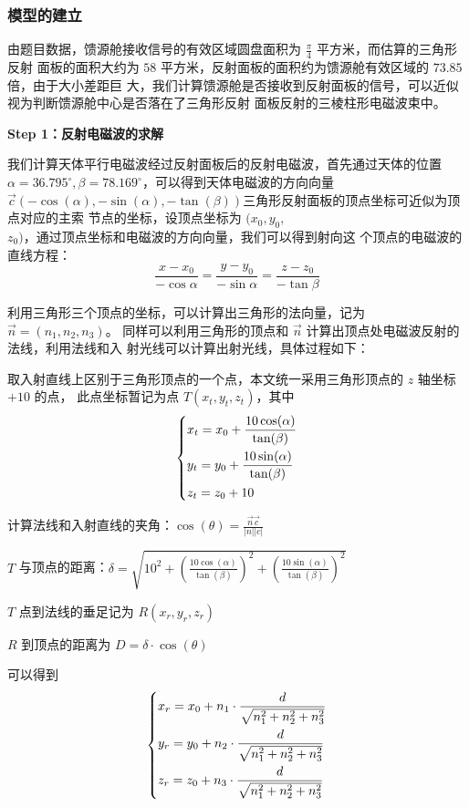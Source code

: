 \documentclass[withoutpreface,bwprint]{cumcmthesis} %
\begin{document}
\subsubsection{模型的建立}
由题目数据，馈源舱接收信号的有效区域圆盘面积为 $\frac{\pi}{4} $ 平方米，而估算的三角形反射
面板的面积大约为 $58$ 平方米，反射面板的面积约为馈源舱有效区域的 $73.85$ 倍，由于大小差距巨
大，我们计算馈源舱是否接收到反射面板的信号，可以近似视为判断馈源舱中心是否落在了三角形反射
面板反射的三棱柱形电磁波束中。

\textbf{Step 1：反射电磁波的求解}

我们计算天体平行电磁波经过反射面板后的反射电磁波，首先通过天体的位置 $\alpha = 36.795^\circ,
\beta = 78.169^\circ$，可以得到天体电磁波的方向向量 $\overrightarrow{c} 
(-\cos(\alpha),-\sin(\alpha),-\tan(\beta))$三角形反射面板的顶点坐标可近似为顶点对应的主索
节点的坐标，设顶点坐标为 $(x_0,y_0,$\\$z_0)$，通过顶点坐标和电磁波的方向向量，我们可以得到射向这
个顶点的电磁波的直线方程：
\[
    \frac{x-x_0}{-\cos\alpha} = \frac{y-y_0}{-\sin\alpha} = \frac{z-z_0}{-\tan\beta} 
\]

利用三角形三个顶点的坐标，可以计算出三角形的法向量，记为 $\overrightarrow{n}=(n_1,n_2,n_3)$。
同样可以利用三角形的顶点和 $\overrightarrow{n} $ 计算出顶点处电磁波反射的法线，利用法线和入
射光线可以计算出射光线，具体过程如下：

取入射直线上区别于三角形顶点的一个点，本文统一采用三角形顶点的 $z$ 轴坐标 $+10$ 的点，
此点坐标暂记为点 $T(x_t,y_t,z_t)$，其中
\[
    \begin{dcases}
        x_t=x_0+\frac{10\cos(\alpha)}{\tan(\beta)} \\
        y_t=y_0+\frac{10\sin(\alpha)}{\tan(\beta)} \\
        z_t=z_0+10
    \end{dcases}
\]

计算法线和入射直线的夹角：$\cos(\theta)=\frac{\displaystyle\overrightarrow{n}\overrightarrow{c}}
{\displaystyle|n||c|}$

\smallskip
$T$ 与顶点的距离：$\delta=\displaystyle\sqrt{10^2+(\frac{\displaystyle10\cos(\alpha)}
{\displaystyle\tan(\beta)})^2+(\frac{\displaystyle10\sin(\alpha)}{\displaystyle\tan(\beta)})^2}$

$T$ 点到法线的垂足记为 $R(x_r,y_r,z_r)$

$R$ 到顶点的距离为 $D=\delta\cdot \cos(\theta)$

可以得到
\[
    \begin{dcases}
        x_r=x_0+n_1 \cdot\frac{d}{\sqrt{n_1^2+n_2^2+n_3^2}}  \\
        y_r=y_0+n_2 \cdot\frac{d}{\sqrt{n_1^2+n_2^2+n_3^2}}  \\
        z_r=z_0+n_3 \cdot\frac{d}{\sqrt{n_1^2+n_2^2+n_3^2}}  \\
    \end{dcases}
\]
\end{document}
